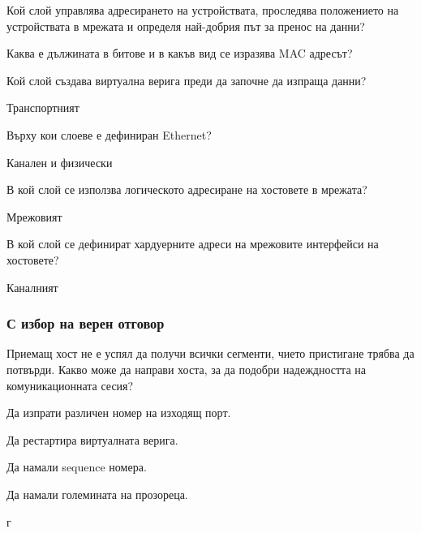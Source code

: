 \begin{q}
  Кой слой управлява адресирането на устройствата, проследява положението на
  устройствата в мрежата и определя най-добрия път за пренос на данни?
\end{q}

\begin{q}
  Каква е дължината в битове и в какъв вид се изразява MAC адресът?
\end{q}

\begin{q}
  Кой слой създава виртуална верига преди да започне да изпраща данни?

  \rans Транспортният
\end{q}

\begin{q}
  Върху кои слоеве е дефиниран Ethernet?

  \rans Канален и физически
\end{q}

\begin{q}
  В кой слой се използва логическото адресиране на хостовете в мрежата?

  \rans Мрежовият
\end{q}

\begin{q}
  В кой слой се дефинират хардуерните адреси на мрежовите интерфейси на
  хостовете?

  \rans Каналният
\end{q}

\subsubsection{С избор на верен отговор}
\begin{q}
  Приемащ хост не е успял да получи всички сегменти, чието пристигане трябва да
  потвърди. Какво може да направи хоста, за да подобри надеждността на
  комуникационната сесия?

  \begin{defractors}
  \item Да изпрати различен номер на изходящ порт.
  \item Да рестартира виртуалната верига.
  \item Да намали sequence номера.
  \item Да намали големината на прозореца.
  \end{defractors}

  \rans г
\end{q}

